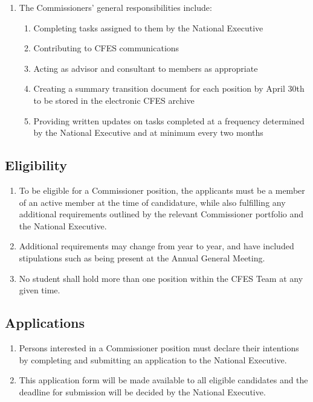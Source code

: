 \begin{enumerate}
 \item
  The Commissioners' general responsibilities include:

  \begin{enumerate}
   \item
    Completing tasks assigned to them by the National Executive
   \item
    Contributing to CFES communications
   \item
    Acting as advisor and consultant to members as appropriate
   \item
    Creating a summary transition document for each position by April 30th to be stored in the electronic CFES archive
   \item
    Providing written updates on tasks completed at a frequency determined by the National Executive and at minimum every two months
  \end{enumerate}
\end{enumerate}

\subsection{Eligibility}
\label{eligibility}

\begin{enumerate}
 \item
  To be eligible for a Commissioner position, the applicants must be a member of an active member at the time of candidature, while also fulfilling any additional requirements outlined by the relevant Commissioner portfolio and the National Executive.
 \item
  Additional requirements may change from year to year, and have included stipulations such as being present at the Annual General Meeting.
 \item
  No student shall hold more than one position within the CFES Team at any given time.
\end{enumerate}

\subsection{Applications}
\label{applications}

\begin{enumerate}
 \item
  Persons interested in a Commissioner position must declare their intentions by completing and submitting an application to the National Executive.
 \item
  This application form will be made available to all eligible candidates and the deadline for submission will be decided by the National Executive.
\end{enumerate}

